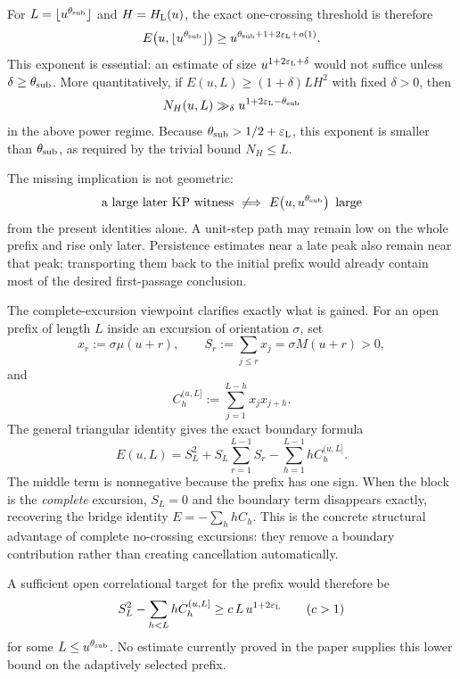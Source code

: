 \documentclass[11pt,reqno]{amsart}
\numberwithin{equation}{section}
\theoremstyle{plain}
\theoremstyle{definition}
\theoremstyle{remark}
\begin{document}
For $L=\lfloor u^{\theta_{\rm sub}}\rfloor$ and
$H=H_{\rm L}(u)$, the exact one-crossing threshold is therefore
\begin{equation}
\label{eq:prefix-energy-littlewood-scale}
 E\!\left(u,\lfloor u^{\theta_{\rm sub}}\rfloor\right)
 \ge
 u^{\theta_{\rm sub}+1+2\varepsilon_{\rm L}+o(1)}.
\end{equation}
This exponent is essential: an estimate of size
$u^{1+2\varepsilon_{\rm L}+\delta}$ would not suffice unless
$\delta\ge\theta_{\rm sub}$.  More quantitatively, if
$E(u,L)\ge(1+\delta)LH^2$ with fixed $\delta>0$, then
\[
 N_H(u,L)\gg_\delta
 u^{1+2\varepsilon_{\rm L}-\theta_{\rm sub}}
\]
in the above power regime.  Because
$\theta_{\rm sub}>1/2+\varepsilon_{\rm L}$, this exponent is smaller than
$\theta_{\rm sub}$, as required by the trivial bound $N_H\le L$.

The missing implication is not geometric:
\[
 \text{a large later KP witness}
 \ \not\Longrightarrow\
 E\!\left(u,u^{\theta_{\rm sub}}\right)
 \text{ large}
\]
from the present identities alone.  A unit-step path may remain low on the
whole prefix and rise only later.  Persistence estimates near a late peak
also remain near that peak; transporting them back to the initial prefix
would already contain most of the desired first-passage conclusion.

The complete-excursion viewpoint clarifies exactly what is gained.  For an
open prefix of length $L$ inside an excursion of orientation $\sigma$, set
\[
 x_r:=\sigma\mu(u+r),\qquad
 S_r:=\sum_{j\le r}x_j=\sigma M(u+r)>0,
\]
and
\[
 C_h^{(u,L]}:=\sum_{j=1}^{L-h}x_jx_{j+h}.
\]
The general triangular identity gives the exact boundary formula
\begin{equation}
\label{eq:open-prefix-energy-corr}
 E(u,L)
 =
 S_L^2+
 S_L\sum_{r=1}^{L-1}S_r
 -
 \sum_{h=1}^{L-1}hC_h^{(u,L]}.
\end{equation}
The middle term is nonnegative because the prefix has one sign.  When the
block is the \emph{complete} excursion, $S_L=0$ and the boundary term
disappears exactly, recovering the bridge identity
$E=-\sum_h hC_h$.  This is the concrete structural advantage of complete
no-crossing excursions: they remove a boundary contribution rather than
creating cancellation automatically.

A sufficient open correlational target for the prefix would therefore be
\[
 S_L^2-\sum_{h<L}hC_h^{(u,L]}
 \ge c\,L\,u^{1+2\varepsilon_{\rm L}}
 \qquad(c>1)
\]
for some $L\le u^{\theta_{\rm sub}}$.  No estimate currently proved in the
paper supplies this lower bound on the adaptively selected prefix.
\end{document}
